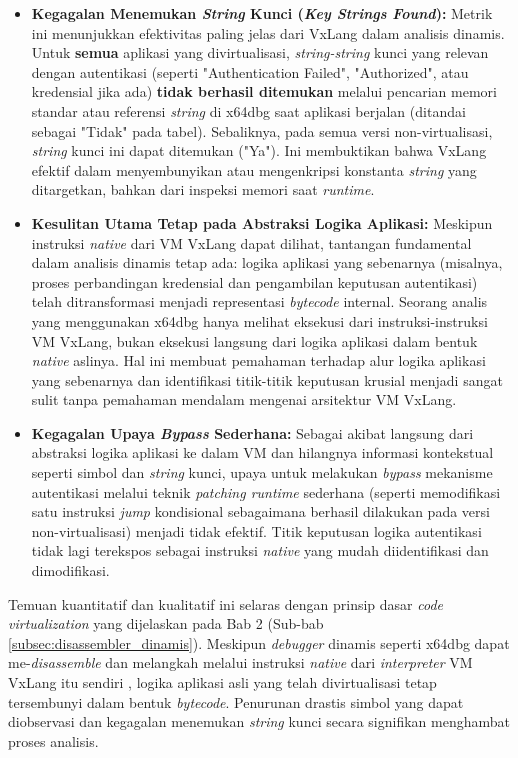 \begin{itemize}
    \item \textbf{Kegagalan Menemukan \textit{String} Kunci (\textit{Key Strings Found}):}
    Metrik ini menunjukkan efektivitas paling jelas dari VxLang dalam analisis dinamis. Untuk \textbf{semua} aplikasi yang divirtualisasi, \textit{string-string} kunci yang relevan dengan autentikasi (seperti "Authentication Failed", "Authorized", atau kredensial jika ada) \textbf{tidak berhasil ditemukan} melalui pencarian memori standar atau referensi \textit{string} di x64dbg saat aplikasi berjalan (ditandai sebagai "Tidak" pada tabel). Sebaliknya, pada semua versi non-virtualisasi, \textit{string} kunci ini dapat ditemukan ("Ya"). Ini membuktikan bahwa VxLang efektif dalam menyembunyikan atau mengenkripsi konstanta \textit{string} yang ditargetkan, bahkan dari inspeksi memori saat \textit{runtime}.

    \item \textbf{Kesulitan Utama Tetap pada Abstraksi Logika Aplikasi:}
    Meskipun instruksi \textit{native} dari VM VxLang dapat dilihat, tantangan fundamental dalam analisis dinamis tetap ada: logika aplikasi yang sebenarnya (misalnya, proses perbandingan kredensial dan pengambilan keputusan autentikasi) telah ditransformasi menjadi representasi \textit{bytecode} internal. Seorang analis yang menggunakan x64dbg hanya melihat eksekusi dari instruksi-instruksi VM VxLang, bukan eksekusi langsung dari logika aplikasi dalam bentuk \textit{native} aslinya. Hal ini membuat pemahaman terhadap alur logika aplikasi yang sebenarnya dan identifikasi titik-titik keputusan krusial menjadi sangat sulit tanpa pemahaman mendalam mengenai arsitektur VM VxLang.

    \item \textbf{Kegagalan Upaya \textit{Bypass} Sederhana:}
    Sebagai akibat langsung dari abstraksi logika aplikasi ke dalam VM dan hilangnya informasi kontekstual seperti simbol dan \textit{string} kunci, upaya untuk melakukan \textit{bypass} mekanisme autentikasi melalui teknik \textit{patching runtime} sederhana (seperti memodifikasi satu instruksi \textit{jump} kondisional sebagaimana berhasil dilakukan pada versi non-virtualisasi) menjadi tidak efektif. Titik keputusan logika autentikasi tidak lagi terekspos sebagai instruksi \textit{native} yang mudah diidentifikasi dan dimodifikasi.
\end{itemize}

Temuan kuantitatif dan kualitatif ini selaras dengan prinsip dasar \textit{code virtualization} yang dijelaskan pada Bab 2 (Sub-bab \ref{subsec:disassembler_dinamis}). Meskipun \textit{debugger} dinamis seperti x64dbg dapat me-\textit{disassemble} dan melangkah melalui instruksi \textit{native} dari \textit{interpreter} VM VxLang itu sendiri \cite{Sikorski2012}, logika aplikasi asli yang telah divirtualisasi tetap tersembunyi dalam bentuk \textit{bytecode}. Penurunan drastis simbol yang dapat diobservasi dan kegagalan menemukan \textit{string} kunci secara signifikan menghambat proses analisis.

